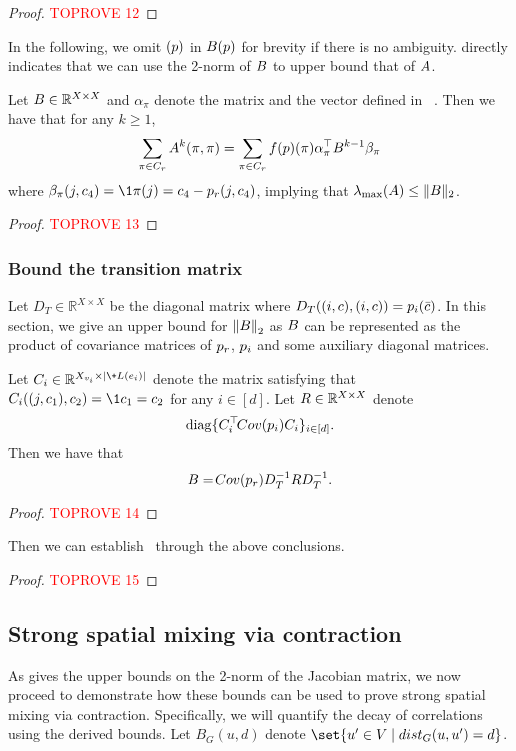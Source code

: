 \documentclass[a4paper,11pt]{article}
\renewcommand{\norm}[1]{\left\|#1\right\|}
\begin{document}
\begin{proof}\textcolor{red}{TOPROVE 12}\end{proof}
In the following, we omit $(\*p)$ in $\*B(\*p)$ for brevity if there is no ambiguity.  directly indicates that we can use the 2-norm of $\*B$ to upper bound that of $\*A$.
\begin{lemma}\label{lem:convert_A_to_B}
    Let $\*B \in \mathbb R^{X\times X}$ and $\alpha_\pi$ denote the matrix and the vector defined in ~.
    Then we have that for any $k\geq 1$,
    \begin{align}\label{eq:lem8}
        \sum_{\pi\in C_r}\*A^k(\pi,\pi)
        = \sum_{\pi\in C_r}f(\*p)(\pi)\alpha_\pi^\top \*B^{k-1}\beta_\pi
    \end{align}
    where $\beta_\pi(j,c_4) = \1{\pi(j) = c_4} - \*p_r(j,c_4)$, implying that $\lambda_{\max}(\*A) \leq \|\*B\|_2$.
\end{lemma}
\begin{proof}\textcolor{red}{TOPROVE 13}\end{proof}
\subsubsection{Bound the transition matrix} \label{sec:bound_Jac}
Let $D_T\in \mathbb{R}^{X\times X}$ be the diagonal matrix where $D_T((i,c),(i,c)) = \*p_i(\bar{c})$.
In this section, we give an upper bound for $\norm{\*B}_2$ as $\*B$ can be represented as the product of covariance matrices of $\*p_r$, $\*p_i$ and some auxiliary diagonal matrices.

\begin{proposition}\label{prop:convert_B_to_Cov}
    Let $C_i\in \mathbb{R}^{X_{v_i}\times |\+L(e_i)|}$ denote the matrix satisfying that $C_i((j,c_1),c_2) = \1{c_1 = c_2}$ for any $i\in [d]$.
    Let $\*R \in \mathbb{R}^{X\times X}$ denote $$
    \operatorname{diag}\{C^\top_i \!{Cov}(\*p_i)C_i\}_{i\in [d]}.
    $$
    Then we have that
    $$
        \*B =  \!{Cov}(\*p_r)D_T^{-1}\*RD_T^{-1}.
    $$
\end{proposition}
\begin{proof}\textcolor{red}{TOPROVE 14}\end{proof}
Then we can establish~ through the above conclusions.
\begin{proof}\textcolor{red}{TOPROVE 15}\end{proof}
\subsection{Strong spatial mixing via contraction}\label{sec:contraction}
\newcommand{\ra}{\rightarrow}
As  gives the upper bounds on the 2-norm of the Jacobian matrix, we now proceed to demonstrate how these bounds can be used to prove strong spatial mixing via contraction. Specifically, we will quantify the decay of correlations using the derived bounds.
Let $B_{G}(u,d)$ denote $\set{u'\in V\mid \dist_G(u,u') = d}$.
\end{document}
